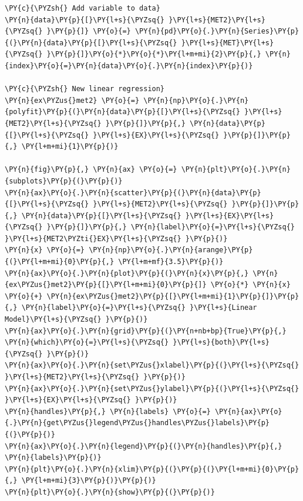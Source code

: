 \documentclass[10pt]{article}\usepackage[]{graphicx}\usepackage[]{xcolor}
\begin{document}
    \begin{Verbatim}[commandchars=\\\{\}]
\PY{c}{\PYZsh{} Add variable to data}
\PY{n}{data}\PY{p}{[}\PY{l+s}{\PYZsq{} }\PY{l+s}{MET2}\PY{l+s}{\PYZsq{} }\PY{p}{]} \PY{o}{=} \PY{n}{pd}\PY{o}{.}\PY{n}{Series}\PY{p}{(}\PY{n}{data}\PY{p}{[}\PY{l+s}{\PYZsq{} }\PY{l+s}{MET}\PY{l+s}{\PYZsq{} }\PY{p}{]}\PY{o}{*}\PY{o}{*}\PY{l+m+mi}{2}\PY{p}{,} \PY{n}{index}\PY{o}{=}\PY{n}{data}\PY{o}{.}\PY{n}{index}\PY{p}{)}

\PY{c}{\PYZsh{} New linear regression}
\PY{n}{ex\PYZus{}met2} \PY{o}{=} \PY{n}{np}\PY{o}{.}\PY{n}{polyfit}\PY{p}{(}\PY{n}{data}\PY{p}{[}\PY{l+s}{\PYZsq{} }\PY{l+s}{MET2}\PY{l+s}{\PYZsq{} }\PY{p}{]}\PY{p}{,} \PY{n}{data}\PY{p}{[}\PY{l+s}{\PYZsq{} }\PY{l+s}{EX}\PY{l+s}{\PYZsq{} }\PY{p}{]}\PY{p}{,} \PY{l+m+mi}{1}\PY{p}{)}

\PY{n}{fig}\PY{p}{,} \PY{n}{ax} \PY{o}{=} \PY{n}{plt}\PY{o}{.}\PY{n}{subplots}\PY{p}{(}\PY{p}{)}
\PY{n}{ax}\PY{o}{.}\PY{n}{scatter}\PY{p}{(}\PY{n}{data}\PY{p}{[}\PY{l+s}{\PYZsq{} }\PY{l+s}{MET2}\PY{l+s}{\PYZsq{} }\PY{p}{]}\PY{p}{,} \PY{n}{data}\PY{p}{[}\PY{l+s}{\PYZsq{} }\PY{l+s}{EX}\PY{l+s}{\PYZsq{} }\PY{p}{]}\PY{p}{,} \PY{n}{label}\PY{o}{=}\PY{l+s}{\PYZsq{} }\PY{l+s}{MET2\PYZti{}EX}\PY{l+s}{\PYZsq{} }\PY{p}{)}
\PY{n}{x} \PY{o}{=} \PY{n}{np}\PY{o}{.}\PY{n}{arange}\PY{p}{(}\PY{l+m+mi}{0}\PY{p}{,} \PY{l+m+mf}{3.5}\PY{p}{)}
\PY{n}{ax}\PY{o}{.}\PY{n}{plot}\PY{p}{(}\PY{n}{x}\PY{p}{,} \PY{n}{ex\PYZus{}met2}\PY{p}{[}\PY{l+m+mi}{0}\PY{p}{]} \PY{o}{*} \PY{n}{x} \PY{o}{+} \PY{n}{ex\PYZus{}met2}\PY{p}{[}\PY{l+m+mi}{1}\PY{p}{]}\PY{p}{,} \PY{n}{label}\PY{o}{=}\PY{l+s}{\PYZsq{} }\PY{l+s}{Linear Model}\PY{l+s}{\PYZsq{} }\PY{p}{)}
\PY{n}{ax}\PY{o}{.}\PY{n}{grid}\PY{p}{(}\PY{n+nb+bp}{True}\PY{p}{,} \PY{n}{which}\PY{o}{=}\PY{l+s}{\PYZsq{} }\PY{l+s}{both}\PY{l+s}{\PYZsq{} }\PY{p}{)}
\PY{n}{ax}\PY{o}{.}\PY{n}{set\PYZus{}xlabel}\PY{p}{(}\PY{l+s}{\PYZsq{} }\PY{l+s}{MET2}\PY{l+s}{\PYZsq{} }\PY{p}{)}
\PY{n}{ax}\PY{o}{.}\PY{n}{set\PYZus{}ylabel}\PY{p}{(}\PY{l+s}{\PYZsq{} }\PY{l+s}{EX}\PY{l+s}{\PYZsq{} }\PY{p}{)}
\PY{n}{handles}\PY{p}{,} \PY{n}{labels} \PY{o}{=} \PY{n}{ax}\PY{o}{.}\PY{n}{get\PYZus{}legend\PYZus{}handles\PYZus{}labels}\PY{p}{(}\PY{p}{)}
\PY{n}{ax}\PY{o}{.}\PY{n}{legend}\PY{p}{(}\PY{n}{handles}\PY{p}{,} \PY{n}{labels}\PY{p}{)}
\PY{n}{plt}\PY{o}{.}\PY{n}{xlim}\PY{p}{(}\PY{p}{(}\PY{l+m+mi}{0}\PY{p}{,} \PY{l+m+mi}{3}\PY{p}{)}\PY{p}{)}
\PY{n}{plt}\PY{o}{.}\PY{n}{show}\PY{p}{(}\PY{p}{)}
\end{Verbatim}
\end{document}
